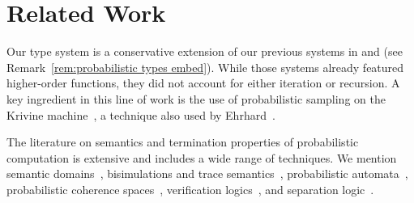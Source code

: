 \documentclass[a4paper,UKenglish,cleveref, autoref, thm-restate]{lipics-v2021}
\newcommand\PFMC{\textrm{PFMC}}
\newcommand\PFMCT{\PFMC$^{\,\smallbin{\Rightarrow\oplus}}$}
\begin{document}


\section{Related Work}
\label{sec:related work}

Our type system is a conservative extension of our previous systems in \cite{Antonelli-DalLago-Pistone-2022} and \cite{Heijltjes-Majury-2025} (see Remark~\ref{rem:probabilistic types embed}). While those systems already featured higher-order functions, they did not account for either iteration or recursion. A key ingredient in this line of work is the use of probabilistic sampling on the Krivine machine~\cite{Krivine-2007}, a technique also used by Ehrhard~\cite{Ehrhard-2019}.

The literature on semantics and termination properties of probabilistic computation is extensive and includes a wide range of techniques. We mention semantic domains~\cite{Dahlqvist-Kozen-2020,Kozen-1981,Vakar-Kammar-Staton-2019}, bisimulations and trace semantics~\cite{vanGlabbeek-Smolka-Steffen-1995,Silva-Sokolova-2011,Stark-Smolka-2000}, probabilistic automata~\cite{Esparza-Kucera-Mayr-2004,Etessami-Yannakakis-2009}, probabilistic coherence spaces~\cite{Crubille-Ehrhard-Pagani-Tasson-2017,Danos-Ehrhard-2011,Ehrhard-Tasson-2019}, verification logics~\cite{FerrerFioriti-Hermanns-2015,McIver-Morgan-Kaminski-Katoen-2018}, and separation logic~\cite{Barthe-Hsu-Liao-2020,Jereb-Simpson-2025}.
\end{document}
